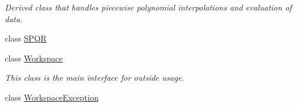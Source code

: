 \begin{DoxyCompactItemize}
\begin{DoxyCompactList}\small\item\em Derived class that handles piecewise polynomial interpolations and evaluation of data. \end{DoxyCompactList}\item 
class \mbox{\hyperlink{class_isotope_fit_1_1_s_p_q_r}{S\+P\+QR}}
\item 
class \mbox{\hyperlink{class_isotope_fit_1_1_workspace}{Workspace}}
\begin{DoxyCompactList}\small\item\em This class is the main interface for outside usage. \end{DoxyCompactList}\item 
class \mbox{\hyperlink{class_isotope_fit_1_1_workspace_exception}{Workspace\+Exception}}
\end{DoxyCompactItemize}

